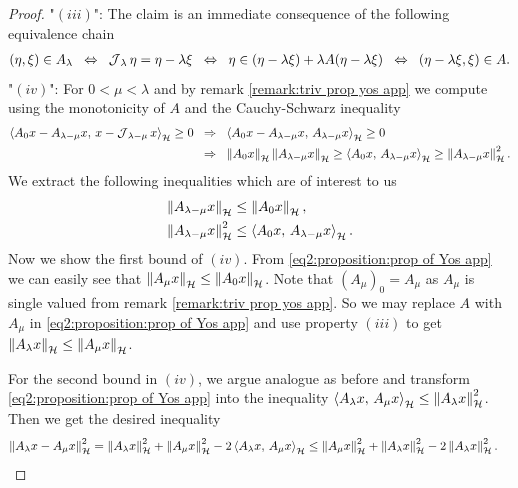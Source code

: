 \begin{proof}
	"$ (iii) $": The claim is an immediate consequence of the following equivalence chain
	\begin{align*}
		(\eta,\xi)\in A_\lambda
		\;\;\Leftrightarrow\;\;
		\operatorname{\mathcal{J}}_\lambda \eta=\eta-\lambda \xi 
		\;\;\Leftrightarrow\;\;
		\eta\in (\eta-\lambda \xi)+\lambda A(\eta-\lambda \xi)
		\;\;\Leftrightarrow\;\;
		(\eta-\lambda \xi, \xi)\in A.
	\end{align*}
	"$ (iv) $":  
	For $ 0<\mu<\lambda $ and by remark \ref{remark:triv prop yos app} 
	we compute using the monotonicity of $ A $ and the Cauchy-Schwarz inequality
	\begin{align*}
		\begin{split}
			\left\langle A_0 x - A_{\lambda-\mu} x,\,x-\operatorname{\mathcal{J}}_{\lambda-\mu} x\right\rangle_{\mathcal{H}}\geq 0
			&\;\;\Rightarrow\;\;
			\left\langle A_0 x - A_{\lambda-\mu} x,\,A_{\lambda-\mu} x\right\rangle_{\mathcal{H}}\geq 0\\
			&\;\;\Rightarrow\;\;
			\left\Vert A_0 x\right\Vert_{\mathcal{H}}\left\Vert A_{\lambda-\mu} x\right\Vert_{\mathcal{H}}
			\geq \left\langle A_0 x,\,A_{\lambda-\mu} x\right\rangle_{\mathcal{H}}
			\geq \left\Vert A_{\lambda-\mu} x\right\Vert_{\mathcal{H}}^2.
		\end{split}
	\end{align*}
	We extract the following inequalities which are of interest to us
	\begin{align}
		\left\Vert A_{\lambda-\mu} x\right\Vert_{\mathcal{H}} 
		&\leq \left\Vert A_0 x\right\Vert_{\mathcal{H}},
		\label{eq2:proposition:prop of Yos app}\\
		\left\Vert A_{\lambda-\mu} x\right\Vert_{\mathcal{H}}^2
		&\leq \left\langle A_0 x,\,A_{\lambda-\mu} x\right\rangle_{\mathcal{H}}.
		\label{eq3:proposition:prop of Yos app}
	\end{align}
	Now we show the first bound of $ (iv) $.
	From \eqref{eq2:proposition:prop of Yos app}
	we can easily see that $ \left\Vert A_\mu x\right\Vert_{\mathcal{H}}\leq\left\Vert A_0 x\right\Vert_{\mathcal{H}} $.
	Note that $ (A_\mu)_0=A_{\mu} $ as $ A_\mu $ is single valued from 
	remark \ref{remark:triv prop yos app}. So we may replace $ A $ with $ A_\mu $ 
	in \eqref{eq2:proposition:prop of Yos app}
	and use property $ (iii) $ to get $ \left\Vert A_\lambda x\right\Vert_{\mathcal{H}}\leq \left\Vert A_\mu x\right\Vert_{\mathcal{H}} $. 
	\smallskip
	
	For the second bound in $ (iv) $, we argue analogue
	as before and transform
	\eqref{eq2:proposition:prop of Yos app}
	into the inequality $ \left\langle A_\lambda x,\,A_\mu x\right\rangle_{\mathcal{H}}\leq \left\Vert A_\lambda x\right\Vert_{\mathcal{H}}^2 $.
	Then we get the desired inequality
	\begin{align*}
		\left\Vert  A_\lambda x- A_\mu x\right\Vert_{\mathcal{H}}^2
		&=\left\Vert  A_\lambda x\right\Vert_{\mathcal{H}}^2+\left\Vert A_\mu x\right\Vert_{\mathcal{H}}^2-2\left\langle A_\lambda x,\,A_\mu x\right\rangle_{\mathcal{H}}
		\leq \left\Vert A_\mu x\right\Vert_{\mathcal{H}}^2+\left\Vert  A_\lambda x\right\Vert_{\mathcal{H}}^2-2\left\Vert A_\lambda x\right\Vert_{\mathcal{H}}^2.
	\end{align*}
	

\end{proof}
